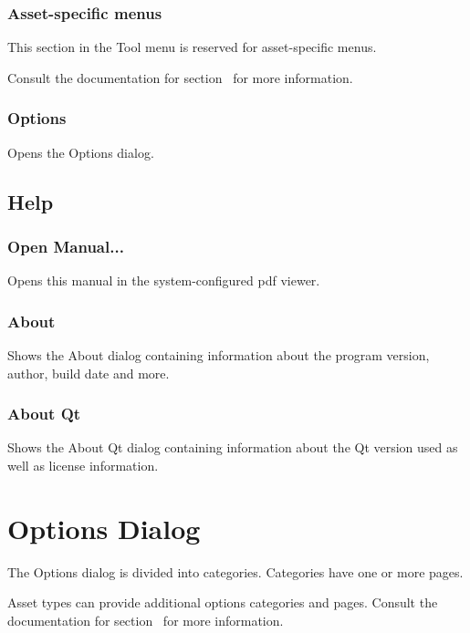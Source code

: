 \documentclass[10pt, a4paper, titlepage, oneside]{article}
\begin{document}
\subsubsection{Asset-specific menus}

This section in the Tool menu is reserved for asset-specific menus.

Consult the documentation for section~ for more information.

\subsubsection{Options}

Opens the Options dialog.

\subsection{Help}

\subsubsection{Open Manual...}

Opens this manual in the system-configured pdf viewer.

\subsubsection{About}

Shows the About dialog containing information about the program version, author, build date and more.

\subsubsection{About Qt}

Shows the About Qt dialog containing information about the Qt version used as well as license information.

\newpage

\section{Options Dialog}

The Options dialog is divided into categories. Categories have one or more pages.

Asset types can provide additional options categories and pages. Consult the documentation for section~ for more information.
\end{document}
